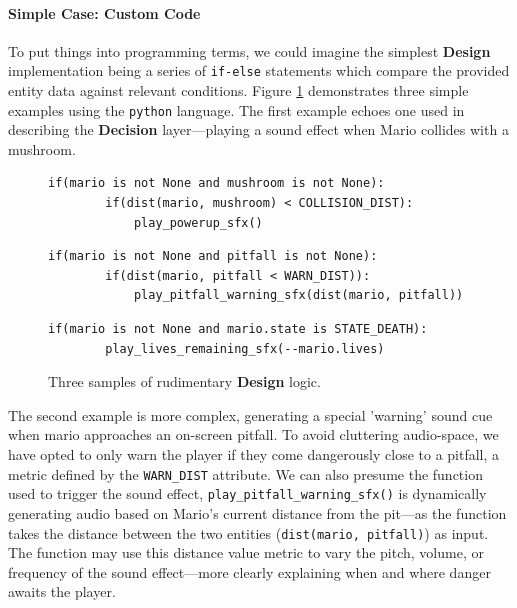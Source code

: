\documentclass{report}
\newcommand{\design}{\textbf{Design}\xspace}
\newcommand{\decision}{\textbf{Decision}\xspace}
\begin{document}
\paragraph{Simple Case: Custom Code}

To put things into programming terms, we could imagine the simplest \design implementation being a series of \texttt{if-else} statements which compare the provided entity data against relevant conditions. Figure \ref{fig:design_code_examples} demonstrates three simple examples using the \texttt{python} language. The first example echoes one used in describing the \decision layer---playing a sound effect when Mario collides with a mushroom. 

\begin{figure}[h]

    \lstset{language=Python}
    \begin{lstlisting}[frame=single]
    if(mario is not None and mushroom is not None):
        if(dist(mario, mushroom) < COLLISION_DIST):
            play_powerup_sfx()
    \end{lstlisting}
    
\begin{lstlisting}[frame=single]
    if(mario is not None and pitfall is not None):
        if(dist(mario, pitfall < WARN_DIST)):
            play_pitfall_warning_sfx(dist(mario, pitfall))
    \end{lstlisting}
    
    \begin{lstlisting}[frame=single]
    if(mario is not None and mario.state is STATE_DEATH):
        play_lives_remaining_sfx(--mario.lives)
    \end{lstlisting}
    
    \caption{Three samples of rudimentary \design logic.}
    \label{fig:design_code_examples}
\end{figure}

The second example is more complex, generating a special 'warning' sound cue when mario approaches an on-screen pitfall. To avoid cluttering audio-space, we have opted to only warn the player if they come dangerously close to a pitfall, a metric defined by the \texttt{WARN\_DIST} attribute. We can also presume the function used to trigger the sound effect, \texttt{play\_pitfall\_warning\_sfx()} is dynamically generating audio based on Mario's current distance from the pit---as the function takes the distance between the two entities (\texttt{dist(mario, pitfall)}) as input. The function may use this distance value metric to vary the pitch, volume, or frequency of the sound effect---more clearly explaining when and where danger awaits the player.
\end{document}
